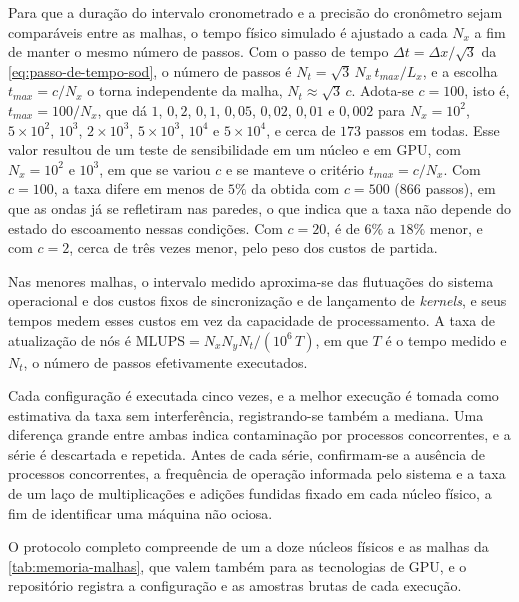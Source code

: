 Para que a duração do intervalo cronometrado e a precisão do cronômetro sejam comparáveis entre as malhas, o tempo físico simulado é ajustado a cada $N_x$ a fim de manter o mesmo número de passos.
Com o passo de tempo $\Delta t = \Delta x/\sqrt{3}$ da \eqref{eq:passo-de-tempo-sod}, o número de passos é $N_t = \sqrt{3}\,N_x\,t_{max}/L_x$, e a escolha $t_{max} = c/N_x$ o torna independente da malha, $N_t \approx \sqrt{3}\,c$.
Adota-se $c = 100$, isto é, $t_{max} = 100/N_x$, que dá $1$, $0{,}2$, $0{,}1$, $0{,}05$, $0{,}02$, $0{,}01$ e $0{,}002$ para $N_x = 10^2$, $5 \times 10^2$, $10^3$, $2 \times 10^3$, $5 \times 10^3$, $10^4$ e $5 \times 10^4$, e cerca de $173$ passos em todas.
Esse valor resultou de um teste de sensibilidade em um núcleo e em GPU, com $N_x = 10^2$ e $10^3$, em que se variou $c$ e se manteve o critério $t_{max} = c/N_x$.
Com $c = 100$, a taxa difere em menos de $5\%$ da obtida com $c = 500$ ($866$ passos), em que as ondas já se refletiram nas paredes, o que indica que a taxa não depende do estado do escoamento nessas condições.
Com $c = 20$, é de $6\%$ a $18\%$ menor, e com $c = 2$, cerca de três vezes menor, pelo peso dos custos de partida.

Nas menores malhas, o intervalo medido aproxima-se das flutuações do sistema operacional e dos custos fixos de sincronização e de lançamento de \textit{kernels}, e seus tempos medem esses custos em vez da capacidade de processamento.
A taxa de atualização de nós é $\mathrm{MLUPS} = N_x N_y N_t / (10^6\,T)$, em que $T$ é o tempo medido e $N_t$, o número de passos efetivamente executados.

Cada configuração é executada cinco vezes, e a melhor execução é tomada como estimativa da taxa sem interferência, registrando-se também a mediana.
Uma diferença grande entre ambas indica contaminação por processos concorrentes, e a série é descartada e repetida.
Antes de cada série, confirmam-se a ausência de processos concorrentes, a frequência de operação informada pelo sistema e a taxa de um laço de multiplicações e adições fundidas fixado em cada núcleo físico, a fim de identificar uma máquina não ociosa.

O protocolo completo compreende de um a doze núcleos físicos e as malhas da \autoref{tab:memoria-malhas}, que valem também para as tecnologias de GPU, e o repositório registra a configuração e as amostras brutas de cada execução.


